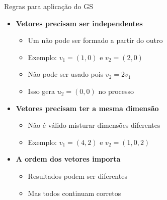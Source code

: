 \documentclass{beamer}
\begin{document}
\begin{frame}{Regras para aplicação do GS}


\vspace{0.5cm}

\begin{itemize}

\item \textbf{Vetores precisam ser independentes}
\begin{itemize}
    \item Um não pode ser formado a partir do outro
    \item Exemplo: $v_1 = (1,0)$ e $v_2 = (2,0)$
    \item Não pode ser usado pois $v_2 = 2v_1$
    \item Isso gera $u_2 = (0,0)$ no processo
\end{itemize}

\vspace{0.4cm}

\item \textbf{Vetores precisam ter a mesma dimensão}
\begin{itemize}
    \item Não é válido misturar dimensões diferentes
    \item Exemplo: $v_1 = (4,2)$ e $v_2 = (1,0,2)$
\end{itemize}

\vspace{0.4cm}

\item \textbf{A ordem dos vetores importa}
\begin{itemize}
    \item Resultados podem ser diferentes
    \item Mas todos continuam corretos
\end{itemize}

\end{itemize}

\end{frame}
\end{document}
